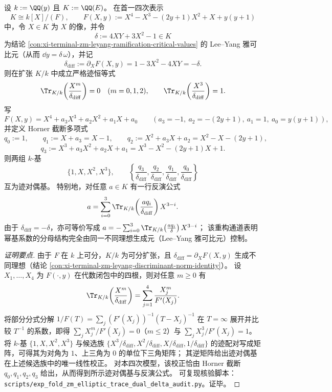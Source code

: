 \begin{conclusion}\label{con:xi-terminal-zm-delta-trace-dual-inversion}
设 \(k:=\QQ(y)\) 且 \(K:=\QQ(E)\)。
在首一四次表示
\[
K\cong k[X]/(F),
\qquad
F(X,y):=X^4-X^3-(2y+1)X^2+X+y(y+1)
\]
中，令 \(X\in K\) 为 \(X\) 的像，并令
\[
\delta:=4XY+3X^2-1\in K
\]
为结论 \ref{con:xi-terminal-zm-leyang-ramification-critical-values} 的 Lee--Yang 雅可比元（从而 \(\dd y=\delta\,\omega\)），并记
\[
\delta_{\mathrm{diff}}:=\partial_XF(X,y)=1-3X^2-4XY=-\delta.
\]
则在扩张 \(K/k\) 中成立严格迹恒等式
\[
\Tr_{K/k}\!\left(\frac{X^m}{\delta_{\mathrm{diff}}}\right)=0\quad(m=0,1,2),
\qquad
\Tr_{K/k}\!\left(\frac{X^3}{\delta_{\mathrm{diff}}}\right)=1.
\]
写
\[
F(X,y)=X^4+a_3X^3+a_2X^2+a_1X+a_0
\qquad
(a_3=-1,\ a_2=-(2y+1),\ a_1=1,\ a_0=y(y+1)),
\]
并定义 Horner 截断多项式
\[
q_0:=1,\qquad
q_1:=X+a_3=X-1,\qquad
q_2:=X^2+a_3X+a_2=X^2-X-(2y+1),
\]
\[
q_3:=X^3+a_3X^2+a_2X+a_1=X^3-X^2-(2y+1)X+1.
\]
则两组 \(k\)-基
\[
\{1,X,X^2,X^3\},
\qquad
\left\{\frac{q_3}{\delta_{\mathrm{diff}}},\frac{q_2}{\delta_{\mathrm{diff}}},\frac{q_1}{\delta_{\mathrm{diff}}},\frac{q_0}{\delta_{\mathrm{diff}}}\right\}
\]
互为迹对偶基。
特别地，对任意 \(a\in K\) 有一行反演公式
\[
a=\sum_{i=0}^{3}\Tr_{K/k}\!\left(\frac{aq_i}{\delta_{\mathrm{diff}}}\right)X^{3-i}.
\]
由于 \(\delta_{\mathrm{diff}}=-\delta\)，亦可等价写成
\(
a=-\sum_{i=0}^{3}\Tr_{K/k}\!\left(\frac{aq_i}{\delta}\right)X^{3-i}
\)；
该重构通道表明幂基系数的分母结构完全由同一不同理想生成元（Lee--Yang 雅可比元）控制。
\end{conclusion}
\begin{proof}[证明要点]
由于 \(F\) 在 \(k\) 上可分，\(K/k\) 为可分扩张，且 \(\delta_{\mathrm{diff}}=\partial_XF(X,y)\) 生成不同理想（结论 \ref{con:xi-terminal-zm-leyang-discriminant-norm-identity}）。
设 \(X_1,\dots,X_4\) 为 \(F(\cdot,y)\) 在代数闭包中的四根，则对任意 \(m\ge 0\) 有
\[
\Tr_{K/k}\!\left(\frac{X^{m}}{\delta_{\mathrm{diff}}}\right)=\sum_{j=1}^{4}\frac{X_j^{m}}{F'(X_j)}.
\]
将部分分式分解
\(
1/F(T)=\sum_{j}(F'(X_j))^{-1}(T-X_j)^{-1}
\)
在 \(T=\infty\) 展开并比较 \(T^{-1}\) 的系数，即得
\(
\sum_j X_j^{m}/F'(X_j)=0
\)（\(m\le 2\)）与
\(
\sum_j X_j^{3}/F'(X_j)=1
\)。
将 \(k\)-基 \(\{1,X,X^2,X^3\}\) 与候选族 \(\{X^3/\delta_{\mathrm{diff}},X^2/\delta_{\mathrm{diff}},X/\delta_{\mathrm{diff}},1/\delta_{\mathrm{diff}}\}\) 的迹配对写成矩阵，可得其为对角为 \(1\)、上三角为 \(0\) 的单位下三角矩阵；
其逆矩阵给出迹对偶基在上述候选族中的唯一线性校正。
对本四次模型，该校正恰由 Horner 截断 \(q_0,q_1,q_2,q_3\) 给出，从而得到所示迹对偶基与反演公式。
可复现核验脚本：\texttt{scripts/exp\_fold\_zm\_elliptic\_trace\_dual\_delta\_audit.py}。证毕。
\end{proof}



